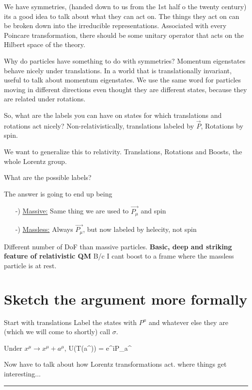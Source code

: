 {We have symmetries, (handed down to us from the 1st half o the twenty century) its a good idea to talk about what they can act on.
The things they act on can be broken down into the irreducible representations.
Associated with every Poincare transformation, there should be some unitary operator that acts on the Hilbert space of the theory.


Why do particles have something to do with symmetries?
Momentum eigenstates behave nicely under translations. 
In a world that is translationally invariant, useful to talk about momentum eigenstates. 
We use the same word for particles moving in different directions even thought they are different states, because they are related under rotations. 

So, what are the labels you can have on states for which translations and rotations act nicely?
Non-relativistically, translations labeled by $\vec{P}$, Rotations by spin. 

We want to generalize this to relativity. 
Translations, Rotations and Boosts, the whole Lorentz group.

What are the possible labels?

The answer is going to end up being
\begin{itemize}
\item[-)] \underline{Massive:} Same thing we are used to $\vec{P_\mu}$ and spin
\item[-)] \underline{Massless:} Always $\vec{P_\mu}$, but now labeled by helecity, not spin
\end{itemize}

Different number of DoF than massive particles.  
\textbf{Basic, deep and striking feature of relativistic QM}
B/c I cant boost to a frame where the massless particle is at rest.

\section*{Sketch the argument more formally}

Start with translations
\be
{}
\ee
Label the states with $P^\mu$ and whatever else they are (which we will come to shortly) call $\sigma$.

Under $x^\mu\rightarrow x^\mu + a^\mu$,
\be
U(T(a^\mu))  = e^{iP_\mu a^\mu}
\ee

Now have to talk about how Lorentz transformations act. 
where things get interesting...

\noindent\rule{\textwidth}{1pt}

}
